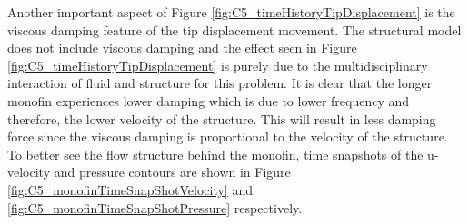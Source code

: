 %
Another important aspect of Figure \ref{fig:C5_timeHistoryTipDisplacement} is the viscous damping feature of the tip displacement movement. The structural model does not include viscous damping and the effect seen in Figure \ref{fig:C5_timeHistoryTipDisplacement} is purely due to the multidisciplinary interaction of fluid and structure for this problem. It is clear that the longer monofin experiences lower damping which is due to lower frequency and therefore, the lower velocity of the structure. This will result in less damping force since the viscous damping is proportional to the velocity of the structure. To better see the flow structure behind the monofin, time snapshots of the u-velocity and pressure contours are shown in Figure \ref{fig:C5_monofinTimeSnapShotVelocity} and \ref{fig:C5_monofinTimeSnapShotPressure} respectively.
%
\begin{figure}[H]
    \centering
    \quad
    \quad
    \\
\end{figure}
